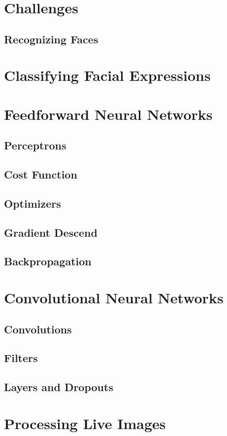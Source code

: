\documentclass[a4paper,english]{report}
\begin{document}
        \chapter{Challenges}
        \section{Recognizing Faces}
        \chapter{Classifying Facial Expressions}
        \chapter{Feedforward Neural Networks}
        \section{Perceptrons}
        \section{Cost Function}
        \section{Optimizers}
        \section{Gradient Descend}
        \section{Backpropagation}        
        \chapter{Convolutional Neural Networks}
        \section{Convolutions}
        \section{Filters}
        \section{Layers and Dropouts}
        \chapter{Processing Live Images}
    
\end{document}
